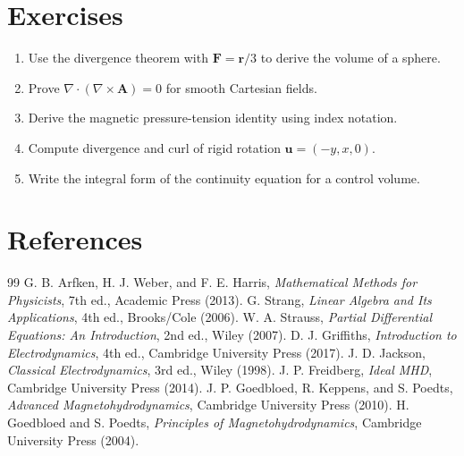 \documentclass[11pt]{article}
\begin{document}
\section{Exercises}
\begin{enumerate}[leftmargin=1.8em]
\item Use the divergence theorem with $\mathbf F=\mathbf r/3$ to derive the volume of a sphere.
\item Prove $\nabla\cdot(\nabla\times\mathbf A)=0$ for smooth Cartesian fields.
\item Derive the magnetic pressure-tension identity using index notation.
\item Compute divergence and curl of rigid rotation $\mathbf u=(-y,x,0)$.
\item Write the integral form of the continuity equation for a control volume.
\end{enumerate}

\section{References}
\begin{thebibliography}{99}
 G. B. Arfken, H. J. Weber, and F. E. Harris, \emph{Mathematical Methods for Physicists}, 7th ed., Academic Press (2013).
 G. Strang, \emph{Linear Algebra and Its Applications}, 4th ed., Brooks/Cole (2006).
 W. A. Strauss, \emph{Partial Differential Equations: An Introduction}, 2nd ed., Wiley (2007).
 D. J. Griffiths, \emph{Introduction to Electrodynamics}, 4th ed., Cambridge University Press (2017).
 J. D. Jackson, \emph{Classical Electrodynamics}, 3rd ed., Wiley (1998).
 J. P. Freidberg, \emph{Ideal MHD}, Cambridge University Press (2014).
 J. P. Goedbloed, R. Keppens, and S. Poedts, \emph{Advanced Magnetohydrodynamics}, Cambridge University Press (2010).
 H. Goedbloed and S. Poedts, \emph{Principles of Magnetohydrodynamics}, Cambridge University Press (2004).
\end{thebibliography}
\end{document}
